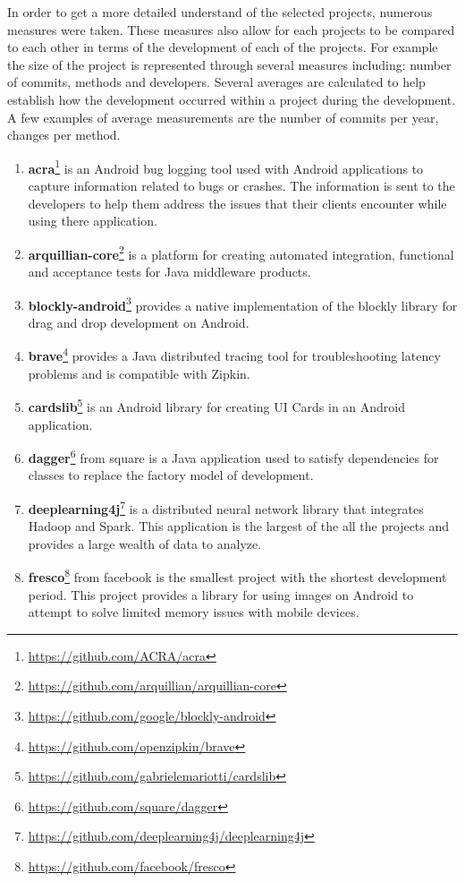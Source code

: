 In order to get a more detailed understand of the selected projects, numerous measures were taken. These measures also allow for each projects to be compared to each other in terms of the development of each of the projects. For example the size of the project is represented through several measures including: number of commits, methods and developers. Several averages are calculated to help establish how the development occurred within a project during the development. A few examples of average measurements are the number of commits per year, changes per method.

\begin{enumerate}
\item \textbf{acra}\footnote{\url{https://github.com/ACRA/acra}} is an Android bug logging tool used with Android applications to capture information related to bugs or crashes. The information is sent to the developers to help them address the issues that their clients encounter while using there application.
\item \textbf{arquillian-core}\footnote{\url{https://github.com/arquillian/arquillian-core}} is a platform for creating automated integration, functional and acceptance tests for Java middleware products. 
\item \textbf{blockly-android}\footnote{\url{https://github.com/google/blockly-android}} provides a native implementation of the blockly library for drag and drop development on Android. 
\item \textbf{brave}\footnote{\url{https://github.com/openzipkin/brave}} provides a Java distributed tracing tool for troubleshooting latency problems and is compatible with Zipkin.
\item \textbf{cardslib}\footnote{\url{https://github.com/gabrielemariotti/cardslib}} is an Android library for creating UI Cards in an Android application.
\item \textbf{dagger}\footnote{\url{https://github.com/square/dagger}} from square is a Java application used to satisfy dependencies for classes to replace the factory model of development.
\item \textbf{deeplearning4j}\footnote{\url{https://github.com/deeplearning4j/deeplearning4j}} is a distributed neural network library that integrates Hadoop and Spark. This application is the largest of the all the projects and provides a large wealth of data to analyze.
\item \textbf{fresco}\footnote{\url{https://github.com/facebook/fresco}} from facebook is the smallest project with the shortest development period. This project provides a library for using images on Android to attempt to solve limited memory issues with mobile devices.

\end{enumerate}
